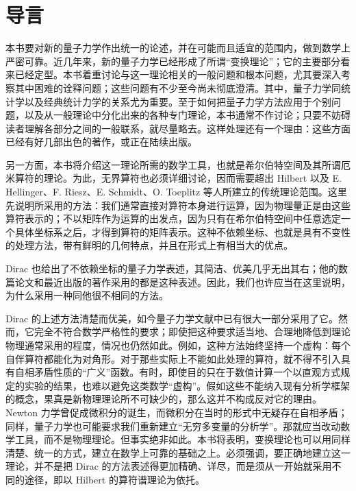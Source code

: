 \documentclass[fontsize=13pt,twoside,openany,headings=normal,parskip=false,bookmarkpackage=false,DIV=calc]{scrbook}
\begin{document}
\chapter*{导言}\label{chap:introduction}
\hypertarget{origpage-1}{}\label{origpage-1}本书要对新的量子力学作出统一的论述，并在可能而且适宜的范围内，做到数学上严密可靠。近几年来，新的量子力学已经形成了所谓“变换理论”；它的主要部分看来已经定型。本书着重讨论与这一理论相关的一般问题和根本问题，尤其要深入考察其中困难的诠释问题；这些问题有不少至今尚未彻底澄清。其中，量子力学同统计学以及经典统计力学的关系尤为重要。至于如何把量子力学方法应用于个别问题，以及从一般理论中分化出来的各种专门理论，本书通常不作讨论；只要不妨碍读者理解各部分之间的一般联系，就尽量略去。这样处理还有一个理由：这些方面已经有好几部出色的著作，或正在陆续出版。

另一方面，本书将介绍这一理论所需的数学工具，也就是希尔伯特空间及其所谓厄米算符的理论。为此，无界算符也必须详细讨论，因而需要超出 Hilbert 以及 E. Hellinger、F. Riesz、E. Schmidt、O. Toeplitz 等人所建立的传统理论范围。这里先说明所采用的方法：我们通常直接对算符本身进行运算，因为物理量正是由这些算符表示的；不以矩阵作为运算的出发点，因为只有在希尔伯特空间中任意选定一个具体坐标系之后，才得到算符的矩阵表示。这种不依赖坐标、也就是具有不变性的处理方法，带有鲜明的几何特点，并且在形式上有相当大的优点。

Dirac 也给出了不依赖坐标的量子力学表述，其简洁、优美几乎无出其右；他的数篇论文和最近出版的\hypertarget{origpage-2}{}\label{origpage-2}著作采用的都是这种表述。因此，我们也许应当在这里说明，为什么采用一种同他很不相同的方法。

Dirac 的上述方法清楚而优美，如今量子力学文献中已有很大一部分采用了它。然而，它完全不符合数学严格性的要求；即使把这种要求适当地、合理地降低到理论物理通常采用的程度，情况也仍然如此。例如，这种方法始终坚持一个虚构：每个自伴算符都能化为对角形。对于那些实际上不能如此处理的算符，就不得不引入具有自相矛盾性质的“广义”函数。有时，即使目的只在于数值计算一个以直观方式规定的实验的结果，也难以避免这类数学“虚构”。假如这些不能纳入现有分析学框架的概念，果真是新物理理论所不可缺少的，那么这并不构成反对它的理由。Newton 力学曾促成微积分的诞生，而微积分在当时的形式中无疑存在自相矛盾；同样，量子力学也可能要求我们重新建立“无穷多变量的分析学”。那就应当改动数学工具，而不是物理理论。但事实绝非如此。本书将表明，变换理论也可以用同样清楚、统一的方式，建立在数学上可靠的基础之上。必须强调，要正确地建立这一理论，并不是把 Dirac 的方法表述得更加精确、详尽，而是须从一开始就采用不同的途径，即以 Hilbert 的算符谱理论为依托。
\end{document}
